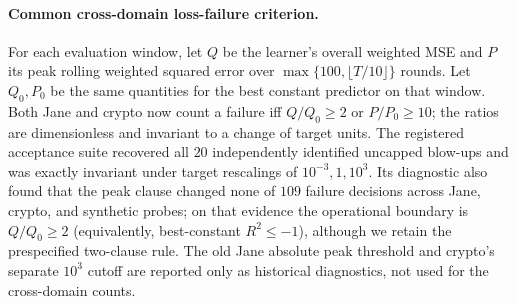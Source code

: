 \documentclass{article}
\begin{document}
\paragraph{Common cross-domain loss-failure criterion.}
\label{app:criterion}
For each evaluation window, let $Q$ be the learner's overall weighted MSE and $P$ its peak
rolling weighted squared error over $\max\{100,\lfloor T/10\rfloor\}$ rounds. Let $Q_0,P_0$
be the same quantities for the best constant predictor on that window. Both Jane and crypto
now count a failure iff $Q/Q_0\ge2$ or $P/P_0\ge10$; the ratios are dimensionless and invariant
to a change of target units. The registered acceptance suite recovered all $20$ independently
identified uncapped blow-ups and was exactly invariant under target rescalings of
$10^{-3},1,10^3$. Its diagnostic also found that the peak clause changed none of $109$ failure
decisions across Jane, crypto, and synthetic probes; on that evidence the operational boundary
is $Q/Q_0\ge2$ (equivalently, best-constant $R^2\le-1$), although we retain the prespecified
two-clause rule. The old Jane absolute peak threshold and crypto's separate $10^3$ cutoff are
reported only as historical diagnostics, not used for the cross-domain counts.
\end{document}
